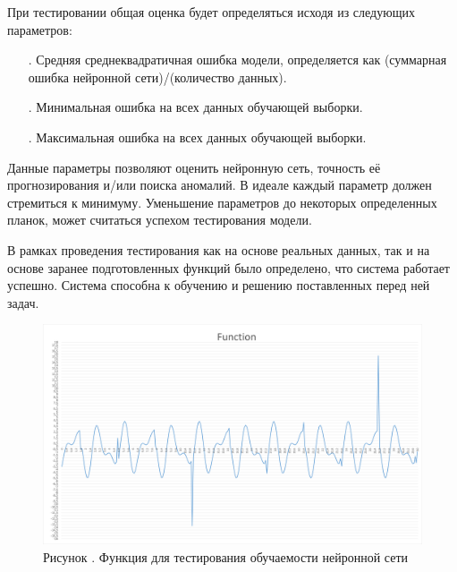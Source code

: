 {	\par \redline При тестировании общая оценка будет определяться исходя из следующих параметров:
	
	\begin{itemize}[leftmargin=2.15cm, labelwidth=0.65cm, labelsep=0.0cm] 		
		\item[\theitemcntr. ]  Средняя среднеквадратичная ошибка модели, определяется как (суммарная \newline ошибка нейронной сети)/(количество данных).
		\addtocounter{itemcntr}{1}
		
		\item[\theitemcntr. ] Минимальная ошибка на всех данных обучающей выборки.
		\addtocounter{itemcntr}{1}
		
		\item[\theitemcntr. ] Максимальная ошибка на всех данных обучающей выборки.
		\addtocounter{itemcntr}{1}
		
		\setcounter{itemcntr}{1}
	\end{itemize}  
	
	\par \redline Данные параметры позволяют оценить нейронную сеть, точность её прогнозирования и/или поиска аномалий. В идеале каждый параметр должен стремиться к минимуму. Уменьшение параметров до некоторых определенных планок, может считаться успехом тестирования модели.
	 
	\par \redline В рамках проведения тестирования как на основе реальных данных, так и на основе заранее подготовленных функций было определено, что система работает успешно. Система способна к обучению и решению поставленных перед ней задач.
	
	
	\par
	
	\begin{figure}
		\centering
		\def\svgwidth{\textwidth}
		\includegraphics[scale=0.5]{images/graphic2.png}
		\caption*{\gostFont Рисунок \thechaptercntr .\theimagecntr \spc {--} Функция для тестирования обучаемости нейронной сети}
		\label{fig:MLADBlackBox}
	\end{figure} \addtocounter{imagecntr}{1}
	
	
}


\setcounter{subchaptercntr}{1}
\setcounter{formulacntr}{1}
\setcounter{imagecntr}{1}
\setcounter{tablecntr}{1}

